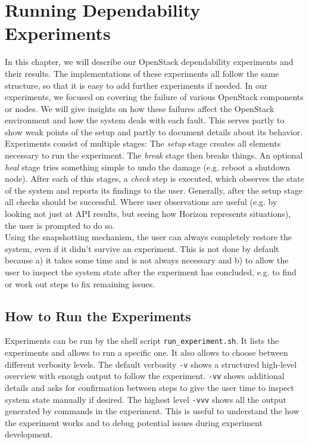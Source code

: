\section[Running Dependability Experiments \texorpdfstring{{\textbf{\tiny \enspace (JE, SK)}}}{}]{Running Dependability Experiments}
\label{experiments}
In this chapter, we will describe our OpenStack dependability experiments and their results. The implementations of these experiments all follow the same structure, so that it is easy to add further experiments if needed. In our experiments, we focused on covering the failure of various OpenStack components or nodes. We will give insights on how these failures affect the OpenStack environment and how the system deals with each fault. This serves partly to show weak points of the setup and partly to document details about its behavior.\\

Experiments consist of multiple stages: The \emph{setup} stage creates all elements necessary to run the experiment. The \emph{break} stage then breaks things. An optional \emph{heal} stage tries something simple to undo the damage (e.g. reboot a shutdown node). After each of this stages, a \emph{check} step is executed, which observes the state of the system and reports its findings to the user. Generally, after the setup stage all checks should be successful. Where user observations are useful (e.g. by looking not just at API results, but seeing how Horizon represents situations), the user is prompted to do so.\\

Using the snapshotting mechanism, the user can always completely restore the system, even if it didn't survive an experiment. This is not done by default because a) it takes some time and is not always necessary and b) to allow the user to inspect the system state after the experiment has concluded, e.g. to find or work out steps to fix remaining issues.

\subsection{How to Run the Experiments}

Experiments can be run by the shell script \texttt{run\_experiment.sh}. It lists the experiments and allows to run a specific one. It also allows to choose between different verbosity levels. The default verbosity \texttt{-v} shows a structured high-level overview with enough output to follow the experiment. \texttt{-vv} shows additional details and asks for confirmation between steps to give the user time to inspect system state manually if desired. The highest level \texttt{-vvv} shows all the output generated by commands in the experiment. This is useful to understand the how the experiment works and to debug potential issues during experiment development.\\

